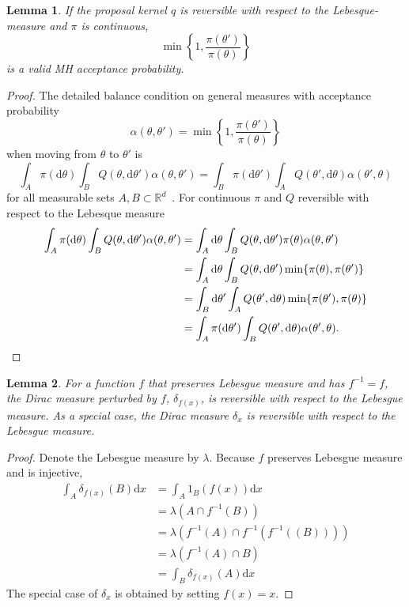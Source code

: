 \documentclass[english,twoside,openright]{HYgraduMLDS}
\newtheorem{lemma}{Lemma}
\newcommand{\R}{\mathbb{R}}
\newcommand{\dx}{\mathrm{d}}
\begin{document}
\begin{lemma}\label{reversible_proposal_lemma}
  If the proposal kernel \(q\) is reversible with respect to the
  Lebesque-measure and \(\pi\) is continuous,
  \[
    \min\left\{1, \frac{\pi(\theta')}{\pi(\theta)}\right\}
  \]
  is a valid MH acceptance probability.
\end{lemma}
\begin{proof}
  The detailed balance condition on general measures
  with acceptance probability
  \[
    \alpha(\theta, \theta') = \min\left\{1, \frac{\pi(\theta')}{\pi(\theta)}\right\}
  \]
  when moving from \(\theta\) to \(\theta'\) is
  \[
    \int_{A}\pi(\dx \theta)\int_{B}Q(\theta, \dx \theta')\alpha(\theta, \theta')
    = \int_{B}\pi(\dx \theta')\int_{A}Q(\theta', \dx \theta)\alpha(\theta', \theta)
  \]
  for all measurable sets \(A, B\subset \R^{d}\)~\cite{Tie98}.
  For continuous \(\pi\) and \(Q\) reversible with respect to the Lebesque measure
  \begin{align*}
    \int_{A}\pi(\dx \theta)\int_{B}Q(\theta, \dx \theta')\alpha(\theta, \theta')
    &= \int_{A}\dx \theta\int_{B}Q(\theta, \dx \theta')\pi(\theta)\alpha(\theta, \theta')
    \\&= \int_{A}\dx\theta\int_{B}Q(\theta, \dx \theta')\min\{\pi(\theta), \pi(\theta')\}
    \\&= \int_{B}\dx\theta'\int_{A}Q(\theta', \dx \theta)\min\{\pi(\theta'), \pi(\theta)\}
    \\&= \int_{A}\pi(\dx \theta')\int_{B}Q(\theta', \dx \theta)\alpha(\theta', \theta).
    \qedhere
  \end{align*}
\end{proof}

\begin{lemma}\label{dirac_measure_reversible_lemma}
  For a function \(f\) that preserves Lebesgue measure and has
  \(f^{-1} = f\),
	the Dirac measure perturbed by \(f\), \(\delta_{f(x)}\), is reversible
  with respect to the Lebesgue measure. As a special case,
  the Dirac measure \(\delta_{x}\) is reversible with respect to the
  Lebesgue measure.
\end{lemma}
\begin{proof}
  Denote the Lebesgue measure by \(\lambda\). Because \(f\) preserves
  Lebesgue measure and is injective,
	\begin{align*}
    \int_{A}\delta_{f(x)}(B)\dx x
    &= \int_{A}1_{B}(f(x))\dx x
    \\&= \lambda(A\cap f^{-1}(B))
    \\&= \lambda(f^{-1}(A)\cap f^{-1}(f^{-1}((B))))
    \\&= \lambda(f^{-1}(A)\cap B)
    \\&= \int_{B}\delta_{f(x)}(A)\dx x
  \end{align*}
  The special case of \(\delta_{x}\) is obtained by setting \(f(x) = x\).
\end{proof}
\end{document}
